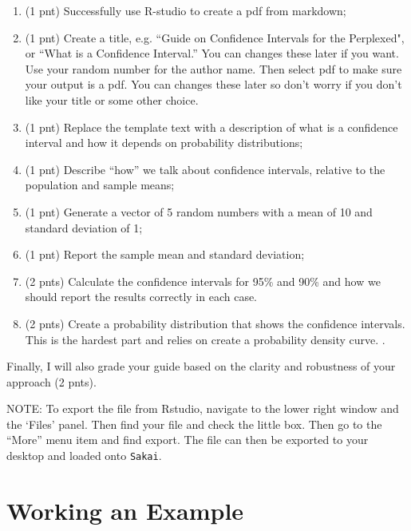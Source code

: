 \documentclass{tufte-handout}\usepackage[]{graphicx}\usepackage[]{color}
\begin{document}
\begin{enumerate}
  \item (1 pnt) Successfully use R-studio to create a pdf from markdown;
  \item (1 pnt) Create a title, e.g. ``Guide on Confidence Intervals for the Perplexed", or ``What is a Confidence Interval.'' You can changes these later if you want. Use your random number for the author name. Then select pdf to make sure your output is a pdf. You can changes these later so don't worry if you don't like your title or some other choice.
  \item (1 pnt) Replace the template text with a description of what is a confidence interval and how it depends on probability distributions; 
  \item (1 pnt) Describe ``how'' we talk about confidence intervals, relative to the population and sample means;
  \item (1 pnt) Generate a vector of 5 random numbers with a mean of 10 and standard deviation of 1;
  \item (1 pnt) Report the sample mean and standard deviation;
  \item (2 pnts) Calculate the confidence intervals for 95\% and 90\% and how we should report the results correctly in each case.
  \item (2 pnts) Create a probability distribution that shows the confidence intervals. This is the hardest part and relies on create a probability density curve. . 
  
\end{enumerate}

Finally, I will also grade your guide based on the clarity and robustness of your approach (2 pnts). 

NOTE: To export the file from Rstudio, navigate to the lower right window and the `Files' panel. Then find your file and check the little box. Then go to the ``More'' menu item and find export. The file can then be exported to your desktop and loaded onto \texttt{Sakai}. 

\section{Working an Example}
\end{document}
